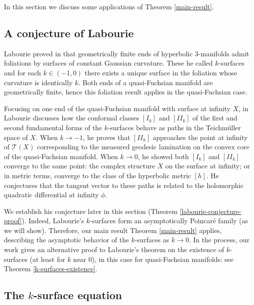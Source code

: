 \documentclass{amsart}
\newcommand{\two}{I\!\!I}
\begin{document}
\noindent In this section we discuss some applications of Theorem \ref{main-result}. 



\subsection{A conjecture of Labourie}



Labourie proved in \cite{labourie1991} that geometrically finite ends of hyperbolic 3-manifolds admit foliations by surfaces of constant Gaussian curvature. 
These he called $k$-surfaces and for each $k \in (-1,0)$ there exists a unique surface in the foliation whose curvature is identically $k$.
Both ends of a quasi-Fuchsian manifold are geometrically finite, hence this foliation result applies in the quasi-Fuchsian case.

Focusing on one end of the quasi-Fuchsian manifold with surface at infinity $X$, in \cite{labourie1992} Labourie discusses how the conformal classes $[I_k]$ and $[\two_k]$ of the first and second fundamental forms of the $k$-surfaces behave as paths in the Teichm\"uller space of $X$. 
When $k \to -1$, he proves that $[\two_k]$ approaches the point at infinity of $\mathcal{T}(X)$ corresponding to the measured geodesic lamination on the convex core of the quasi-Fuchsian manifold. 
When $k \to 0$, he showed both $[I_k]$ and $[\two_k]$ converge to the same point: the complex structure $X$ on the surface at infinity; or in metric terms, converge to the class of the hyperbolic metric $[h]$.
He conjectures that the tangent vector to these paths is related to the holomorphic quadratic differential at infinity $\phi$. 

We establish his conjecture later in this section (Theorem \ref{labourie-conjecture-proof}). 
Indeed, Labourie's $k$-surfaces form an asymptotically Poincar\'e family (as we will show). 
Therefore, our main result Theorem \ref{main-result} applies, describing the asymptotic behavior of the $k$-surfaces as $k \to 0$. 
In the process, our work gives an alternative proof to Labourie's theorem on the existence of $k$-surfaces (at least for $k$ near 0), in this case for quasi-Fuchsian manifolds: see Theorem \ref{k-surfaces-existence}.



\subsection{The $k$-surface equation}
\end{document}

